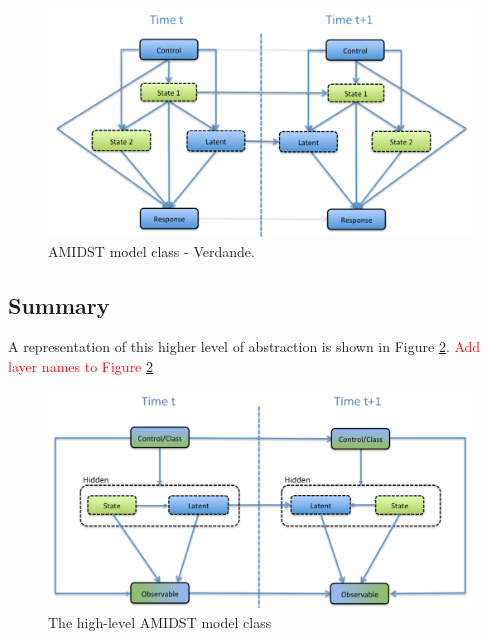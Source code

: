 \begin{figure}[ht!]
\begin{center}
\includegraphics[scale=0.39]{./figures/AMIDSTModelClassVerdande}
\caption{\label{Figure:AMIDSTModelClassVerdande} AMIDST model class - Verdande.}
\end{center}
\end{figure}


\subsection{Summary}\label{summaryAMIDSTModels}

A representation of this higher level of abstraction is shown in Figure \ref{Figure:AMIDSTModelClassHighLevel}. \textcolor{red}{Add layer names to Figure \ref{Figure:AMIDSTModelClassHighLevel}}

\begin{figure}[ht!]
\begin{center}
\includegraphics[scale=0.4]{./figures/AMIDSTModelClassGeneral}
\caption{\label{Figure:AMIDSTModelClassHighLevel} The high-level AMIDST model class}
\end{center}
\end{figure}


